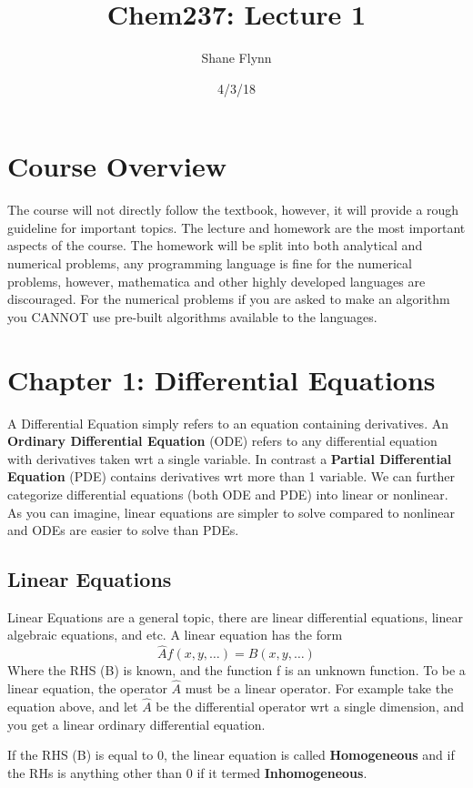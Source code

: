 \documentclass{article}
\title{Chem237: Lecture 1}
\date{4/3/18}
\author{Shane Flynn}
\newcommand{\be}{\begin{equation}}
\newcommand{\ee}{\end{equation}}
\begin{document}
\maketitle
\section*{Course Overview}
The course will not directly follow the textbook, however, it will provide a rough guideline for important topics.
The lecture and homework are the most important aspects of the course.
The homework will be split into both analytical and numerical problems, any programming language is fine for the numerical problems, however, mathematica and other highly developed languages are discouraged.
For the numerical problems if you are asked to make an algorithm you CANNOT use pre-built algorithms available to the languages.

\section*{Chapter 1: Differential Equations}
A Differential Equation simply refers to an equation containing derivatives.
An \textbf{Ordinary Differential Equation} (ODE) refers to any differential equation with derivatives taken wrt a single variable.
In contrast a \textbf{Partial Differential Equation} (PDE) contains derivatives wrt more than 1 variable.
We can further categorize differential equations (both ODE and PDE) into linear or nonlinear.
As you can imagine, linear equations are simpler to solve compared to nonlinear and ODEs are easier to solve than PDEs.

\subsection*{Linear Equations}
Linear Equations are a general topic, there are linear differential equations, linear algebraic equations, and etc.
A linear equation has the form
\be
\hat{A} f(x,y,\hdots) = B(x,y,\hdots)
\ee
Where the RHS (B) is known, and the function f is an unknown function.
To be a linear equation, the operator $\hat{A}$ must be a linear operator.
For example take the equation above, and let $\hat{A}$ be the differential operator wrt a single dimension, and you get a linear ordinary differential equation.

If the RHS (B) is equal to 0, the linear equation is called \textbf{Homogeneous} and if the RHs is anything other than 0 if it termed \textbf{Inhomogeneous}.
\end{document}
